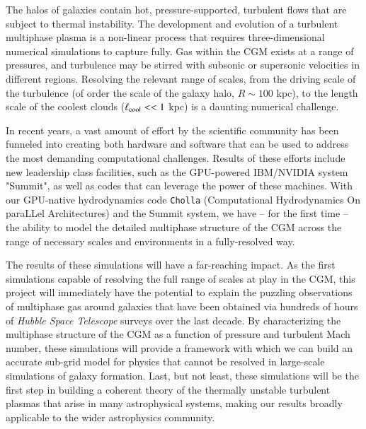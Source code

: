 \documentclass[11pt,letterpaper,english]{article}
\begin{document}
The halos of galaxies contain hot, pressure-supported, turbulent flows that are subject to thermal instability. The development and evolution of a turbulent multiphase plasma is a non-linear process that requires three-dimensional numerical simulations to capture fully. Gas within the CGM exists at a range of pressures, and turbulence may be stirred with subsonic or supersonic velocities in different regions. Resolving the relevant range of scales, from the driving scale of the turbulence (of order the scale of the galaxy halo, $R\sim 100$ kpc), to the length scale of the coolest clouds ($\ell_{\rm cool} << 1$ kpc) is a daunting numerical challenge.
\vspace{.15in}

In recent years, a vast amount of effort by the scientific community has been funneled into creating both hardware and software that can be used to address the most demanding computational challenges. Results of these efforts include new leadership class facilities, such as the GPU-powered IBM/NVIDIA system "Summit", as well as codes that can leverage the power of these machines. With our GPU-native hydrodynamics code {\tt Cholla} (Computational Hydrodynamics On paraLLel Architectures) and the Summit system, we have -- for the first time -- the ability to model the detailed multiphase structure of the CGM across the range of necessary scales and environments in a fully-resolved way.
\vspace{.15in}

The results of these simulations will have a far-reaching impact. As the first simulations capable of resolving the full range of scales at play in the CGM, this project will immediately have the potential to explain the puzzling observations of multiphase gas around galaxies that have been obtained via hundreds of hours of {\it Hubble Space Telescope} surveys over the last decade. By characterizing the multiphase structure of the CGM as a function of pressure and turbulent Mach number, these simulations will provide a framework with which we can build an accurate sub-grid model for physics that cannot be resolved in large-scale simulations of galaxy formation. Last, but not least, these simulations will be the first step in building a coherent theory of the thermally unstable turbulent plasmas that arise in many astrophysical systems, making our results broadly applicable to the wider astrophysics community.

\end{document}
